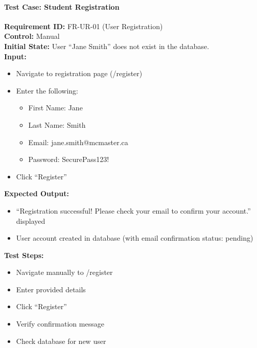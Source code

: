 \documentclass[12pt, titlepage]{article}
\begin{document}
\paragraph{Test Case: Student Registration}
\textbf{Requirement ID:} FR-UR-01 (User Registration) \\
\textbf{Control:} Manual \\
\textbf{Initial State:} User ``Jane Smith'' does not exist in the database. \\
\textbf{Input:}
\begin{itemize}
    \item Navigate to registration page (/register)
    \item Enter the following:
    \begin{itemize}
        \item First Name: Jane
        \item Last Name: Smith
        \item Email: jane.smith@mcmaster.ca
        \item Password: SecurePass123!
    \end{itemize}
    \item Click ``Register''
\end{itemize}
\textbf{Expected Output:}
\begin{itemize}
    \item ``Registration successful! Please check your email to confirm your account.'' displayed
    \item User account created in database (with email confirmation status: pending)
\end{itemize}
\textbf{Test Steps:}
\begin{itemize}
    \item Navigate manually to /register
    \item Enter provided details
    \item Click ``Register''
    \item Verify confirmation message
    \item Check database for new user
\end{itemize}
\end{document}
